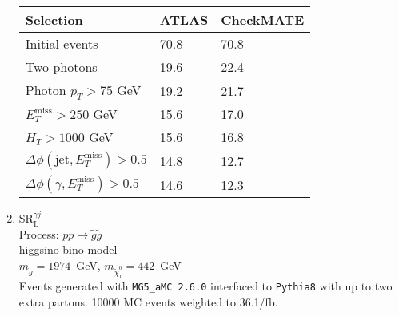 \documentclass[12pt,fleqn]{article}
\begin{document}
\begin{enumerate}
\begin{table}[h!] 
 \renewcommand*{\arraystretch}{1.2}
 \begin{tabular}{l|p{3cm}|p{3cm}} \toprule
  Selection                                                                       & ATLAS    & CheckMATE       \\ \midrule
  Initial events                                                                  & 70.8     &  70.8          \\
  Two photons                                                                     & 19.6     &  22.4 \\
  Photon $p_T>75$ GeV                                                             & 19.2     &  21.7 \\
  $E_T^\mathrm{miss} > 250$ GeV                                                   & 15.6     &  17.0 \\
  $H_T > 1000$ GeV                                                                & 15.6     &  16.8  \\ 
  $\Delta\phi(\mathrm{jet},E_T^\mathrm{miss}) > 0.5$                              & 14.8     &  12.7  \\  
  $\Delta\phi(\gamma,E_T^\mathrm{miss}) > 0.5$                                    & 14.6     &  12.3  \\ \bottomrule
 \end{tabular}
\end{table} 

\newpage
\item{$\mathrm{SR}^{\gamma j}_{\mathrm{L}}$\\}
 Process: $ p p \to \tilde{g} \tilde{g}$\\
 higgsino-bino model\\
 $m_{\tilde{g}} = 1974$~GeV, $m_{\tilde{\chi}_1^0} = 442$~GeV\\
 Events generated with \texttt{MG5\_aMC 2.6.0} interfaced to \texttt{Pythia8} with up to two extra partons.
 10000 MC events weighted to 36.1/fb.


\end{enumerate}
\end{document}
